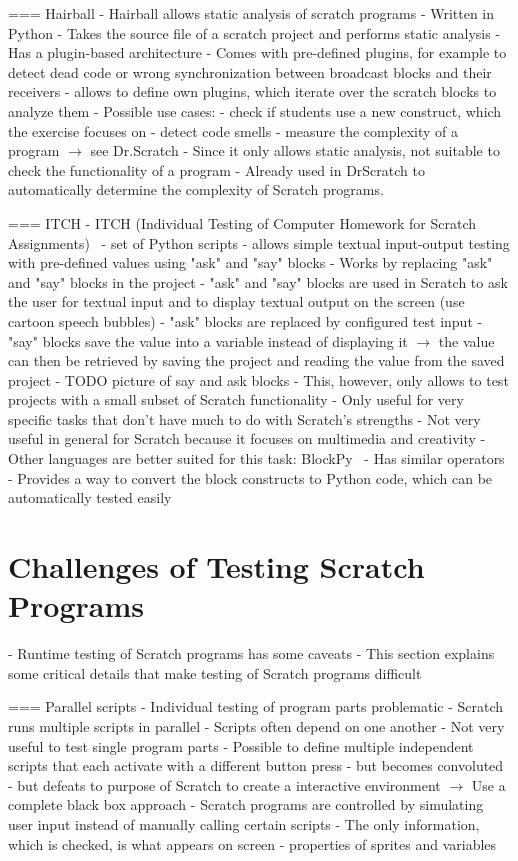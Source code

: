 === Hairball
- Hairball \cite{hairball} allows static analysis of scratch programs
- Written in Python
- Takes the source file of a scratch project and performs static analysis
- Has a plugin-based architecture
    - Comes with pre-defined plugins, for example to detect dead code or wrong synchronization between broadcast blocks and their receivers
    - allows to define own plugins, which iterate over the scratch blocks to analyze them
- Possible use cases:
    - check if students use a new construct, which the exercise focuses on
    - detect code smells
    - measure the complexity of a program $\rightarrow$ see Dr.Scratch
- Since it only allows static analysis, not suitable to check the functionality of a program
- Already used in DrScratch \cite{drscratch} to automatically determine the complexity of Scratch programs.

=== ITCH
- ITCH (Individual Testing of Computer Homework for Scratch Assignments)~\cite{itch}
- set of Python scripts
- allows simple textual input-output testing with pre-defined values using "ask" and "say" blocks
- Works by replacing "ask" and "say" blocks in the project
    - "ask" and "say" blocks are used in Scratch to ask the user for textual input and to display textual output on the screen
      (use cartoon speech bubbles)
    - "ask" blocks are replaced by configured test input
    - "say" blocks save the value into a variable instead of displaying it
    $\rightarrow$ the value can then be retrieved by saving the project and reading the value from the saved project
    - TODO picture of say and ask blocks
- This, however, only allows to test projects with a small subset of Scratch functionality
- Only useful for very specific tasks that don't have much to do with Scratch's strengths
- Not very useful in general for Scratch because it focuses on multimedia and creativity
- Other languages are better suited for this task: BlockPy~\cite{blockpy}
    - Has similar operators
    - Provides a way to convert the block constructs to Python code, which can be automatically tested easily

\section{Challenges of Testing Scratch Programs}
- Runtime testing of Scratch programs has some caveats
- This section explains some critical details that make testing of Scratch programs difficult

=== Parallel scripts
- Individual testing of program parts problematic
    - Scratch runs multiple scripts in parallel
        - Scripts often depend on one another
    - Not very useful to test single program parts
    - Possible to define multiple independent scripts that each activate with a different button press
        - but becomes convoluted
        - but defeats to purpose of Scratch to create a interactive environment
$\rightarrow$ Use a complete black box approach
    - Scratch programs are controlled by simulating user input instead of manually calling certain scripts
    - The only information, which is checked, is what appears on screen
        - properties of sprites and variables

